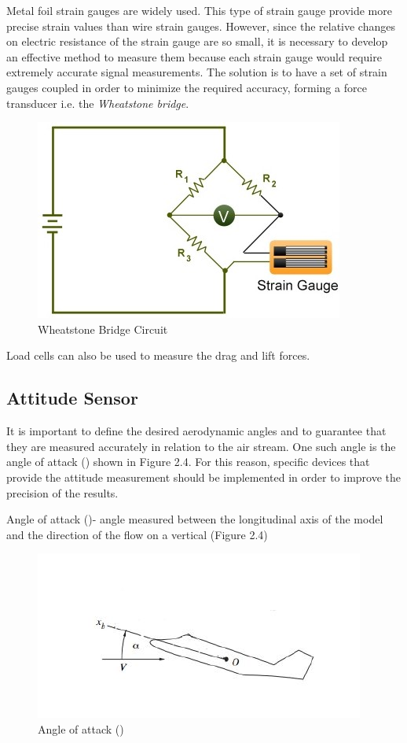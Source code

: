Metal foil strain gauges are widely used. This type of strain gauge provide more precise strain values than wire strain gauges. However, since the relative changes on electric resistance of the strain gauge are so small, it is necessary to develop an effective method to measure them because each strain gauge would require extremely accurate signal measurements. The solution is to have a set of strain gauges coupled in order to minimize the required accuracy, forming a force transducer i.e. the \textit{Wheatstone bridge}.
\begin{center}
		\begin{figure}[!h]
		\centering
		\includegraphics[width=0.6\linewidth]{Figures/Fig9}
		\caption[Wheatstone Bridge Circuit]{Wheatstone Bridge Circuit \cite{ferreira2015design}}
		\end{figure}
\end{center}
Load cells can also be used to measure the drag and lift forces.
\subsection{Attitude Sensor}
It is important to define the desired aerodynamic angles and to guarantee that they are measured accurately in relation to the air stream. One such angle is the angle of attack (\textalpha) shown in Figure 2.4. For this reason, specific devices that provide the attitude measurement should be implemented in order to improve the precision of the results.

Angle of attack (\textalpha)- angle measured between the longitudinal axis of the model and the direction of the flow on a vertical (Figure 2.4)
\begin{center}
	\begin{figure}[!h]
	\centering
	\includegraphics[width=0.6\linewidth]{Figures/Fig10}
	\caption[Angle of attack]{Angle of attack (\textalpha) \cite{ferreira2015design}}
	\end{figure}
\end{center}
